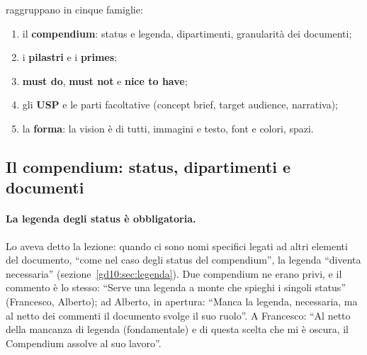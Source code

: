 raggruppano in cinque famiglie:
\begin{enumerate}
  \item il \textbf{compendium}: status e legenda, dipartimenti, granularità
        dei documenti;
  \item i \textbf{pilastri} e i \textbf{primes};
  \item \textbf{must do}, \textbf{must not} e \textbf{nice to have};
  \item gli \textbf{USP} e le parti facoltative (concept brief, target
        audience, narrativa);
  \item la \textbf{forma}: la vision è di tutti, immagini e testo, font e
        colori, spazi.
\end{enumerate}

\subsection{Il compendium: status, dipartimenti e documenti}
\label{rv:t5:sec:compendium}

\paragraph{La legenda degli status è obbligatoria.} Lo aveva detto la
lezione: quando ci sono nomi specifici legati ad altri elementi del
documento, ``come nel caso degli status del compendium'', la legenda
``diventa necessaria'' (sezione~\ref{gd10:sec:legenda}). Due compendium ne
erano privi, e il commento è lo stesso: ``Serve una legenda a monte che
spieghi i singoli status'' (Francesco, Alberto); ad Alberto, in apertura:
``Manca la legenda, necessaria, ma al netto dei commenti il documento svolge
il suo ruolo''. A Francesco: ``Al netto della mancanza di legenda
(fondamentale) e di questa scelta che mi è oscura, il Compendium assolve al
suo lavoro''.

